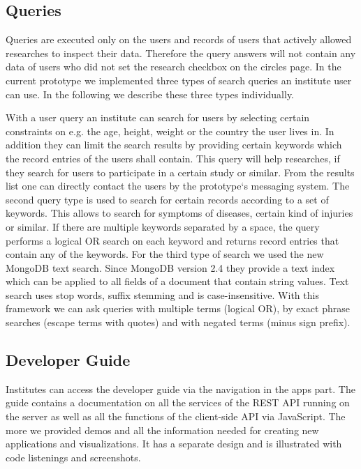 \subsection{Queries}

Queries are executed only on the users and records of users that actively allowed researches to inspect their data. Therefore the query answers will not contain any data of users who did not set the research checkbox on the circles page. In the current prototype we implemented three types of search queries an institute user can use. In the following we describe these three types individually.

With a user query an institute can search for users by selecting certain constraints on e.g. the age, height, weight or the country the user lives in. In addition they can limit the search results by providing certain keywords which the record entries of the users shall contain. This query will help researches, if they search for users to participate in a certain study or similar. From the results list one can directly contact the users by the prototype`s messaging system. \newline
The second query type is used to search for certain records according to a set of keywords. This allows to search for symptoms of diseases, certain kind of injuries or similar. If there are multiple keywords separated by a space, the query performs a logical OR search on each keyword and returns record entries that contain any of the keywords.\newline
For the third type of search we used the new MongoDB text search. Since MongoDB version 2.4 they provide a text index which can be applied to all fields of a document that contain string values. Text search uses stop words, suffix stemming and is case-insensitive. With this framework we can ask queries with multiple terms (logical OR), by exact phrase searches (escape terms with quotes) and with negated terms (minus sign prefix). 

\subsection{Developer Guide}

Institutes can access the developer guide via the navigation in the apps part. The guide contains a documentation on all the services of the REST API running on the server as well as all the functions of the client-side API via JavaScript. The more we provided demos and all the information needed for creating new applications and visualizations. It has a separate design and is illustrated with code listenings and screenshots. 

